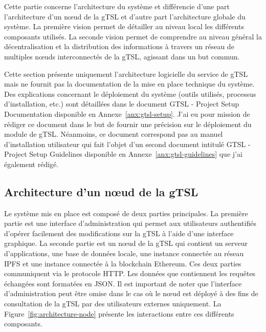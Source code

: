 \documentclass{tnreport}
\begin{document}
Cette partie concerne l'architecture du système et différencie d'une part l'architecture d'un nœud de la gTSL et d'autre part l'architecture globale du système. La première vision permet de détailler au niveau local les différents composants utilisés. La seconde vision permet de comprendre au niveau général la décentralisation et la distribution des informations à travers un réseau de multiples nœuds interconnectés de la gTSL, agissant dans un but commun.

Cette section présente uniquement l'architecture logicielle du service de gTSL mais ne fournit pas la documentation de la mise en place technique du système. Des explications concernant le déploiement du système (outils utilisés, processus d'installation, etc.) sont détaillées dans le document GTSL - Project Setup Documentation disponible en Annexe~\ref{anx:gtsl-setup}. J'ai eu pour mission de rédiger ce document dans le but de fournir une précision sur le déploiement du module de gTSL. Néanmoins, ce document correspond pas au manuel d'installation utilisateur qui fait l'objet d'un second document intitulé GTSL - Project Setup Guidelines disponible en Annexe~\ref{anx:gtsl-guidelines} que j'ai également rédigé.

\subsection{Architecture d'un nœud de la gTSL}

Le système mis en place est composé de deux parties principales. La première partie est une interface d'administration qui permet aux utilisateurs authentifiés d'opérer facilement des modifications sur la gTSL à l'aide d'une interface graphique. La seconde partie est un nœud de la gTSL qui contient un serveur d'applications, une base de données locale, une instance connectée au réseau IPFS et une instance connectée à la blockchain Ethereum. Ces deux parties communiquent via le protocole HTTP. Les données que contiennent les requêtes échangées sont formatées en JSON. Il est important de noter que l'interface d'administration peut être omise dans le cas où le nœud est déployé à des fins de consultation de la gTSL par des utilisateurs externes uniquement. La Figure~\ref{fig:architecture-node} présente les interactions entre ces différents composants.
\clearpage
\end{document}
